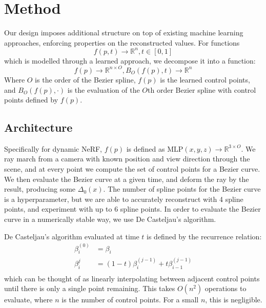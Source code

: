 \section*{Method}

Our design imposes additional structure on top of existing machine learning
approaches, enforcing properties on the reconstructed values. For functions \[ f(p, t)\to\mathbb{R}^n, t\in[0,1] \] which is modelled through
a learned approach, we decompose it into a function: \[ f(p)\to\mathbb{R}^{n\times O}, B_O(f(p), t)\to\mathbb{R}^n
\] Where
$O$ is the order of the Bezier spline, $f(p)$ is the learned control points, and $B_O(f(p), \cdot)$ is the evaluation
of the $O$th order Bezier spline with control points defined by $f(p)$.

\subsection*{Architecture}

Specifically for dynamic NeRF, $f(p)$ is defined as
$\text{MLP}(x,y,z)\to\mathbb{R}^{3\times O}$. We ray march from a camera with known position and
view direction through the scene, and at every point we compute the set of control points for a Bezier curve. We then evaluate the Bezier curve at a given time, and deform the ray by the result, producing some $\Delta_0(x)$. The number of spline points for the Bezier curve is a  hyperparameter, but we are able to accurately reconstruct with 4 spline points, and experiment with up to 6 spline points. In order to evaluate the Bezier curve in a numerically stable way, we use De Casteljau's algorithm. 

De Casteljau's algorithm evaluated at time $t$ is defined by the recurrence relation:
\begin{align*}
  \beta_i^{(0)} &= \beta_i \nonumber \\
  \beta_i^{j} &= (1-t)\beta_i^{(j-1)} + t\beta_{i-1}^{(j-1)} \nonumber \\
\end{align*}
which can be thought of as linearly interpolating between adjacent control points until there is only a single point remaining. This takes $O(n^2)$ operations to evaluate, where $n$ is the number of control points. For a small $n$, this is negligible.

